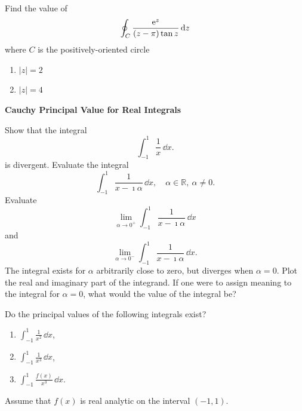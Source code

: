 {%
\begin{Exercise}
  \label{exercise e^z/((z-pi)tan(z))}
  Find the value of 
  \[
  \oint_C \frac{\mathop{\mathrm{e}}\nolimits^z}{ (z - \pi) \tan z } \,\mathrm{d} z
  \]
  where $C$ is the positively-oriented circle
  \begin{enumerate}
  \item $|z| = 2$
  \item $|z| = 4$
  \end{enumerate}

\end{Exercise}






\begin{large}
  \noindent
  \textbf{Cauchy Principal Value for Real Integrals}
\end{large}





\begin{Solution}
  Show that the integral
  \[
  \int_{-1}^1 \frac{1}{x} \,\dd x.
  \]
  is divergent.
  Evaluate the integral
  \[
  \int_{-1}^1 \frac{1}{x - \imath \alpha} \,\dd x, \quad \alpha \in \mathbb{R},\ \alpha \neq 0.
  \]
  Evaluate
  \[
  \lim_{\alpha \to 0^+} \int_{-1}^1 \frac{1}{x - \imath \alpha} \,\dd x
  \]
  and
  \[
  \lim_{\alpha \to 0^-} \int_{-1}^1 \frac{1}{x - \imath \alpha} \,\dd x.
  \]
  The integral exists for $\alpha$ arbitrarily close to zero, but diverges 
  when $\alpha = 0$.  Plot the real and imaginary part of the integrand.  If one 
  were to assign meaning to the integral for $\alpha = 0$, what would the value
  of the integral be?
\end{Solution}







\begin{Exercise}
  \label{exercise cpv 1/x^2}
  Do the principal values of the following integrals exist?
  \begin{enumerate}
  \item $\int_{-1}^1 \frac{1}{x^2} \,\dd x$,
  \item $\int_{-1}^1 \frac{1}{x^3} \,\dd x$,
  \item $\int_{-1}^1 \frac{f(x)}{x^3} \,\dd x$.
  \end{enumerate}
  Assume that $f(x)$ is real analytic on the interval $(-1,1)$.


\end{Exercise}}
